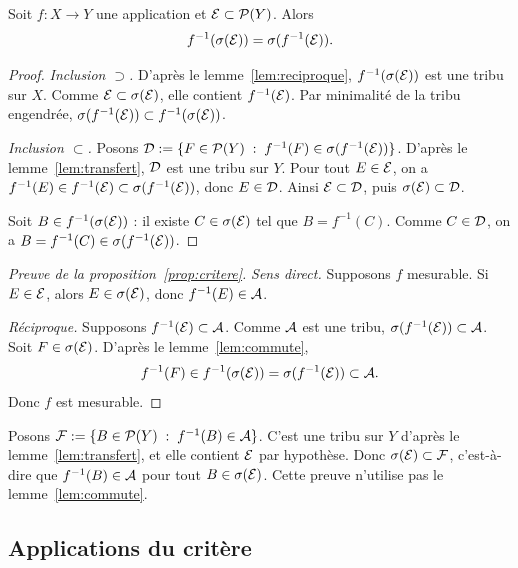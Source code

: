 \documentclass[11pt]{article}
\begin{document}
\begin{lemme}\label{lem:commute}
Soit $f : X \to Y$ une application et $\mathcal{E} \subset \mathcal{P}(Y)$. Alors
\[
  f^{-1}(\sigma(\mathcal{E})) = \sigma(f^{-1}(\mathcal{E})).
\]
\end{lemme}

\begin{proof}
\emph{Inclusion $\supset$.} D'après le lemme~\ref{lem:reciproque}, $f^{-1}(\sigma(\mathcal{E}))$ est une tribu sur $X$. Comme $\mathcal{E} \subset \sigma(\mathcal{E})$, elle contient $f^{-1}(\mathcal{E})$. Par minimalité de la tribu engendrée, $\sigma(f^{-1}(\mathcal{E})) \subset f^{-1}(\sigma(\mathcal{E}))$.

\emph{Inclusion $\subset$.} Posons $\mathcal{D} := \{F \in \mathcal{P}(Y) \;:\; f^{-1}(F) \in \sigma(f^{-1}(\mathcal{E}))\}$. D'après le lemme~\ref{lem:transfert}, $\mathcal{D}$ est une tribu sur $Y$. Pour tout $E \in \mathcal{E}$, on a $f^{-1}(E) \in f^{-1}(\mathcal{E}) \subset \sigma(f^{-1}(\mathcal{E}))$, donc $E \in \mathcal{D}$. Ainsi $\mathcal{E} \subset \mathcal{D}$, puis $\sigma(\mathcal{E}) \subset \mathcal{D}$.

Soit $B \in f^{-1}(\sigma(\mathcal{E}))$ : il existe $C \in \sigma(\mathcal{E})$ tel que $B = f^{-1}(C)$. Comme $C \in \mathcal{D}$, on a $B = f^{-1}(C) \in \sigma(f^{-1}(\mathcal{E}))$.
\end{proof}

\begin{proof}[Preuve de la proposition~\ref{prop:critere}]
\emph{Sens direct.} Supposons $f$ mesurable. Si $E \in \mathcal{E}$, alors $E \in \sigma(\mathcal{E})$, donc $f^{-1}(E) \in \mathcal{A}$.

\emph{Réciproque.} Supposons $f^{-1}(\mathcal{E}) \subset \mathcal{A}$. Comme $\mathcal{A}$ est une tribu, $\sigma(f^{-1}(\mathcal{E})) \subset \mathcal{A}$. Soit $F \in \sigma(\mathcal{E})$. D'après le lemme~\ref{lem:commute},
\[
  f^{-1}(F) \in f^{-1}(\sigma(\mathcal{E})) = \sigma(f^{-1}(\mathcal{E})) \subset \mathcal{A}.
\]
Donc $f$ est mesurable.
\end{proof}

\begin{remarque}
Posons $\mathcal{F} := \{B \in \mathcal{P}(Y) \;:\; f^{-1}(B) \in \mathcal{A}\}$. C'est une tribu sur $Y$ d'après le lemme~\ref{lem:transfert}, et elle contient $\mathcal{E}$ par hypothèse. Donc $\sigma(\mathcal{E}) \subset \mathcal{F}$, c'est-à-dire que $f^{-1}(B) \in \mathcal{A}$ pour tout $B \in \sigma(\mathcal{E})$. Cette preuve n'utilise pas le lemme~\ref{lem:commute}.
\end{remarque}

\subsection*{Applications du critère}
\end{document}
